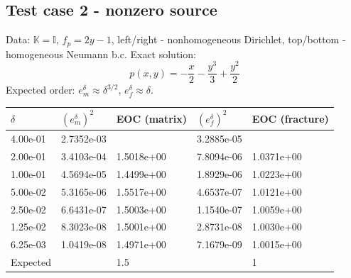 \documentclass[a4paper]{article}
\def\tn#1{{\mathbb{#1}}}    %
\begin{document}
% 



\subsection{Test case 2 - nonzero source}

Data: $\tn K=\tn I$, $f_p=2y-1$, left/right - nonhomogeneous Dirichlet, top/bottom - homogeneous Neumann b.c.
Exact solution:
\[ p(x,y) = -\frac{x}2 - \frac{y^3}3 + \frac{y^2}2 \]
Expected order: $e_m^\delta\approx\delta^{3/2}$, $e_f^\delta\approx\delta$.

\begin{tabular}{|l|ll|ll|}
\hline
$\delta$ & $(e_m^\delta)^2$ & EOC (matrix) & $(e_f^\delta)^2$ & EOC (fracture)\\
\hline
4.00e-01 & 2.7352e-03 &            & 3.2885e-05 &           \\
2.00e-01 & 3.4103e-04 & 1.5018e+00 & 7.8094e-06 & 1.0371e+00\\
1.00e-01 & 4.5694e-05 & 1.4499e+00 & 1.8929e-06 & 1.0223e+00\\
5.00e-02 & 5.3165e-06 & 1.5517e+00 & 4.6537e-07 & 1.0121e+00\\
2.50e-02 & 6.6431e-07 & 1.5003e+00 & 1.1540e-07 & 1.0059e+00\\
1.25e-02 & 8.3023e-08 & 1.5001e+00 & 2.8731e-08 & 1.0030e+00\\
6.25e-03 & 1.0419e-08 & 1.4971e+00 & 7.1679e-09 & 1.0015e+00\\
\hline
Expected & & 1.5 & & 1\\
\hline
\end{tabular}
\end{document}
